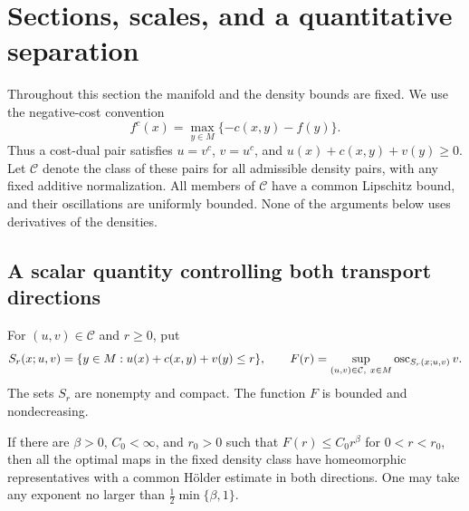 \section{Sections, scales, and a quantitative separation}
\label{sc:section}

Throughout this section the manifold and the density bounds are fixed.
We use the negative-cost convention
\[
 f^c(x)=\max_{y\in M}\{-c(x,y)-f(y)\}.
\]
Thus a cost-dual pair satisfies $u=v^c$, $v=u^c$, and
$u(x)+c(x,y)+v(y)\geq0$.
Let $\mathcal C$ denote the class of these pairs for all admissible density
pairs, with any fixed additive normalization.
All members of $\mathcal C$ have a common Lipschitz bound, and their
oscillations are uniformly bounded.
None of the arguments below uses derivatives of the densities.

\subsection{A scalar quantity controlling both transport directions}

For $(u,v)\in\mathcal C$ and $r\geq0$, put
\[
 S_r(x;u,v)=\{y\in M:u(x)+c(x,y)+v(y)\leq r\},
 \qquad
 F(r)=\sup_{(u,v)\in\mathcal C,\ x\in M}
       \operatorname{osc}_{S_r(x;u,v)}v.
\]
The sets $S_r$ are nonempty and compact.  The function $F$ is bounded
and nondecreasing.

\begin{lemma}\label{sc:power}
If there are $\beta>0$, $C_0<\infty$, and $r_0>0$ such that
$F(r)\leq C_0r^\beta$ for $0<r<r_0$, then all the optimal maps in the
fixed density class have homeomorphic representatives with a common
H\"older estimate in both directions.
One may take any exponent no larger than
$\frac12\min\{\beta,1\}$.
\end{lemma}

